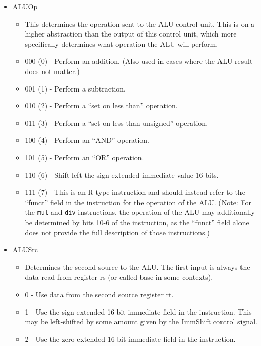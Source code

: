 \documentclass[
    paper=letter,
    parskip=half,
    fontsize=12pt,
    titlepage=firstiscover,
    toc=bibliography,
    numbers=endperiod
]{scrartcl}
\providecommand{\tightlist}{%
  \setlength{\itemsep}{0pt}\setlength{\parskip}{0pt}}
\begin{document}
\begin{itemize}
    \item ALUOp
          \begin{itemize}
              \tightlist
              \item This determines the operation sent to the ALU control unit. This is on a
                    higher abstraction than the output of this control unit, which more
                    specifically determines what operation the ALU will perform.
              \item 000 (0) - Perform an addition. (Also used in cases where the ALU result does not matter.)
              \item 001 (1) - Perform a subtraction.
              \item 010 (2) - Perform a ``set on less than'' operation.
              \item 011 (3) - Perform a ``set on less than unsigned'' operation.
              \item 100 (4) - Perform an ``AND'' operation.
              \item 101 (5) - Perform an ``OR'' operation.
              \item 110 (6) - Shift left the sign-extended immediate value 16 bits.
              \item 111 (7) - This is an R-type instruction and should instead
                    refer to the ``funct'' field in the instruction for the
                    operation of the ALU. (Note: For the \texttt{mul} and
                    \texttt{div} instructions, the operation of the ALU may
                    additionally be determined by bits 10-6 of the instruction, as
                    the ``funct'' field alone does not provide the full description
                    of those instructions.)
          \end{itemize}

    \item ALUSrc
          \begin{itemize}
              \tightlist
              \item Determines the second source to the ALU. The first input is always the
                    data read from register rs (or called base in some contexts).
              \item 0 - Use data from the second source register rt.
              \item 1 - Use the sign-extended 16-bit immediate field in the instruction.
                    This may be left-shifted by some amount given by the ImmShift control signal.
              \item 2 - Use the zero-extended 16-bit immediate field in the instruction.
          \end{itemize}


\end{itemize}
\end{document}
